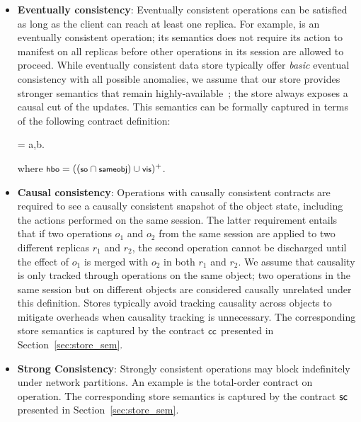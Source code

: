 \begin{itemize}
\setlength{\itemsep}{2pt}

\item \textbf{Eventually consistency}: Eventually consistent operations can
  be satisfied as long as the client can reach at least one replica. For
  example,  is an eventually consistent operation; its semantics
  does not require its action to manifest on all replicas before other
  operations in its session are allowed to proceed. While eventually
  consistent data store typically offer \emph{basic} eventual consistency
  with all possible anomalies, we assume that our store provides stronger
  semantics that remain highly-available~\cite{BailisHAT,COPS}; the store
  always exposes a causal cut of the updates. This semantics can be formally
  captured in terms of the following contract definition:

\vspace{-1em}
\begin{smathpar}
\ecc = \forall a,b. ~ \wedge {} \Rightarrow {}
\end{smathpar}
\noindent where $\small \hboZ = ((\soZ \cap \sameobjZ) \cup \visZ)^+$.

\item \textbf{Causal consistency}: Operations with causally consistent
  contracts are required to see a causally consistent snapshot of the object
  state, including the actions performed on the same session.  The latter
  requirement entails that if two operations $o_1$ and $o_2$ from the same
  session are applied to two different replicas $r_1$ and $r_2$, the second
  operation cannot be discharged until the effect of $o_1$ is merged with
  $o_2$ in both $r_1$ and $r_2$.  We assume that causality is only tracked
  through operations on the same object; two operations in the same session
  but on different objects are considered causally unrelated under this
  definition. Stores typically avoid tracking causality across objects to
  mitigate overheads when causality tracking is unnecessary.  The corresponding
  store semantics is captured by the contract ${\sf cc}$ presented in
  Section~\ref{sec:store_sem}.

\item \textbf{Strong Consistency}: Strongly consistent operations may block
  indefinitely under network partitions. An example is the total-order
  contract on  operation. The corresponding store semantics is
  captured by the contract ${\sf sc}$ presented in Section~\ref{sec:store_sem}.

\end{itemize}

